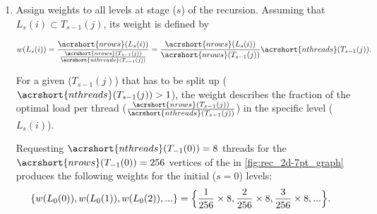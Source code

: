 \begin{enumerate}
	\item  Assign weights to all levels at stage ($s$) of the recursion. Assuming that $L_s(i) \subset T_{s-1}(j)$, its weight is defined by
	
	\begin{align*}
		w(L_s(i)) &= \frac{\acrshort{nrows}(L_s(i))}{\frac{\acrshort{nrows}(T_{s-1}(j))}{\acrshort{nthreads}(T_{s-1}(j))}} = \frac{\acrshort{nrows}(L_s(i))}{\acrshort{nrows}(T_{s-1}(j))}  \acrshort{nthreads}(T_{s-1}(j)).\\
	\end{align*}
	
	 For a given \levelGroup ($T_{s-1}(j)$) that has to be split up ( $\acrshort{nthreads}(T_{s-1}(j)) > 1$), the weight describes the fraction of the optimal load per thread  ($\frac{\acrshort{nrows}(T_{s-1}(j))}{\acrshort{nthreads}(T_{s-1}(j))}$) in the specific level ($L_s(i)$).

	Requesting $\acrshort{nthreads}(T_{-1}(0))=8$ threads for the $\acrshort{nrows}(T_{-1}(0)) = 256$ vertices of the \stex in \cref{fig:rec_2d-7pt_graph} produces the following weights for the initial ($s=0$) levels:
	\begin{align*}
		\{w(L_0(0)), w(L_0(1)), w(L_0(2)), ...\} &= \Big{\{} \frac{1}{256} \times 8 , \frac{2}{256} \times 8 , \frac{3}{256} \times 8 , ...\Big{\}}.
	\end{align*}
	

\end{enumerate}
